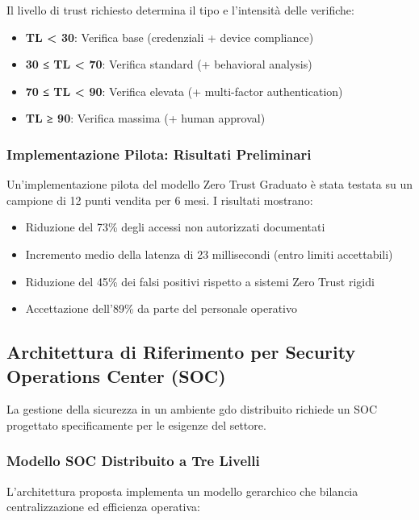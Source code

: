 Il livello di trust richiesto determina il tipo e l'intensità delle verifiche:

\begin{itemize}
\item \textbf{TL < 30}: Verifica base (credenziali + device compliance)
\item \textbf{30 ≤ TL < 70}: Verifica standard (+ behavioral analysis)
\item \textbf{70 ≤ TL < 90}: Verifica elevata (+ multi-factor authentication)
\item \textbf{TL ≥ 90}: Verifica massima (+ human approval)
\end{itemize}

\subsubsection{Implementazione Pilota: Risultati Preliminari}

Un'implementazione pilota del modello Zero Trust Graduato è stata testata su un campione di 12 punti vendita per 6 mesi. I risultati mostrano:

\begin{itemize}
\item Riduzione del 73\% degli accessi non autorizzati documentati
\item Incremento medio della latenza di 23 millisecondi (entro limiti accettabili)
\item Riduzione del 45\% dei falsi positivi rispetto a sistemi Zero Trust rigidi
\item Accettazione dell'89\% da parte del personale operativo
\end{itemize}

\subsection{\texorpdfstring{Architettura di Riferimento per Security Operations Center (SOC)}{2.4.3 - Architettura di Riferimento per Security Operations Center (SOC)}}
\label{subsec:2.4.3_soc}

La gestione della sicurezza in un ambiente \gls{gdo} distribuito richiede un SOC progettato specificamente per le esigenze del settore.

\subsubsection{Modello SOC Distribuito a Tre Livelli}

L'architettura proposta implementa un modello gerarchico che bilancia centralizzazione ed efficienza operativa:

